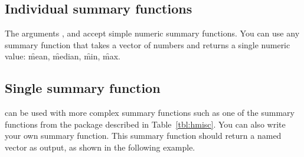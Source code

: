 % 


\subsection{Individual summary functions}

The arguments ,  and  accept simple numeric summary functions. You can use any summary function that takes a vector of numbers and returns a single numeric value: \f{mean}, \f{median}, \f{min}, \f{max}.

% 


\subsection{Single summary function}

 can be used with more complex summary functions such as one of the summary functions from the  package \citep{Hmisc} described in Table~\ref{tbl:hmisc}. You can also write your own summary function. This summary function should return a named vector as output, as shown in the following example.

